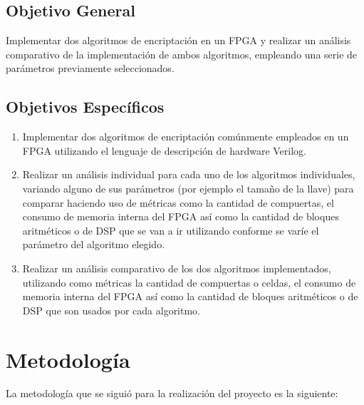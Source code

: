 \subsection{Objetivo General}

Implementar dos algoritmos de encriptación en un FPGA y realizar un análisis comparativo de la implementación de ambos algoritmos, empleando una serie de parámetros previamente seleccionados.


\subsection{Objetivos Específicos}

\begin{enumerate}

\item Implementar dos algoritmos de encriptación comúnmente empleados en un FPGA utilizando el lenguaje de descripción de hardware Verilog.

\item Realizar un análisis individual para cada uno de los algoritmos individuales, variando alguno de sus parámetros (por ejemplo el tamaño de la llave) para comparar haciendo uso de métricas como la cantidad de compuertas, el consumo de memoria interna del FPGA así como la cantidad de bloques aritméticos o de DSP que se van a ir utilizando conforme se varíe el parámetro del algoritmo elegido.

\item Realizar un análisis comparativo de los dos algoritmos implementados, utilizando como métricas la cantidad de compuertas o celdas, el consumo de memoria interna del FPGA así como la cantidad de bloques aritméticos o de DSP que son usados por cada algoritmo.


\end{enumerate}

\section{Metodología}

La metodología que se siguió para la realización del proyecto es la siguiente:

